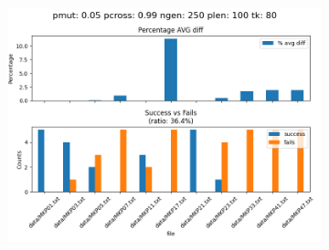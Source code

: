 \begin{figure}[H]
\begin{subfigure}{.3\textwidth}
        \includegraphics[width=\textwidth]{img/tuning/tuning_results_5_99_250_100_80.png}
    \end{subfigure}\\


\end{figure}
